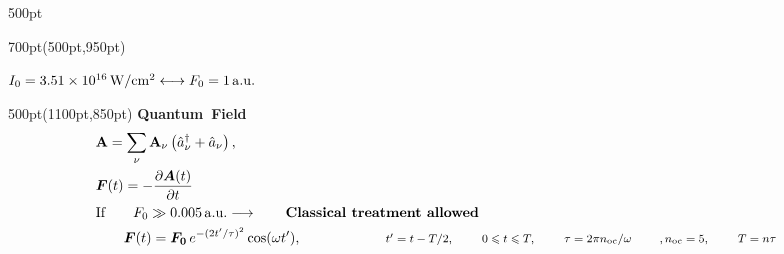 \documentclass[20pt]{beamer}
\begin{document}
\begin{frame}
\begin{textblock*}{500pt}
\begin{minipage}{0.6\linewidth}
\end{minipage}
\end{textblock*}


\begin{textblock*}{700pt}(500pt,950pt)
\small

$I_0 = 3.51 \times 10^{16}\,{\rm W/cm^2} 
\longleftrightarrow F_0 = 1\,{\rm a.u.}$ 

\end{textblock*}




\begin{textblock*}{500pt}(1100pt,850pt)
 \mbox{\normalsize \textbf{Quantum Field}} \hspace{60pt}
 \begin{align}
&   \boldsymbol{\rm A}
  = \sum_\nu \boldsymbol{\rm A}_\nu \left( \hat{a}^{\dagger}_\nu 
    + \hat{a}_\nu\right), \nonumber \\
& \boldsymbol{F}(t) = -\frac{\partial \boldsymbol{A}(t)}{\partial t} \nonumber \\
& \mbox{If}\hspace{20pt} F_0 \gg 0.005\,{\rm a.u.}
 \longrightarrow \hspace{20pt}\mbox{\textbf{Classical treatment allowed}} \nonumber\\
& \hspace{20pt} \boldsymbol{F}(t) = \boldsymbol{F_0}\,e^{-(2t^\prime/\tau)^2} \cos (\omega t^\prime) \nonumber,\hspace{20pt}
\hspace{40pt}\mbox{\footnotesize $t^{\prime} = t - T/2, \hspace{20pt} 0 \leqslant t \leqslant T, 
\hspace{20pt}\tau = 2\pi n_{\rm oc}/\omega \hspace{20pt}, n_{\rm oc} =5, \hspace{20pt} T = n\tau$ \nonumber}
 \end{align}

\end{textblock*}



%
%





\end{frame}
\end{document}
